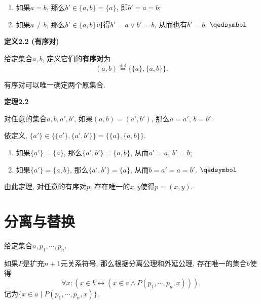 
\begin{enumerate}
    \item 如果$a=b$, 那么$b'\in\{a,b\}=\{a\}$, 即$b'=a=b$;
    \item 如果$a\neq b$, 那么$b'\in\{a,b\}$可得$b'=a\lor b'=b$, 从而也有$b'=b$.
    \hfill $\qedsymbol$
\end{enumerate}

\vspace{10pt}

\hypertarget{sec:定义2.2}{}
\noindent\textbf{定义2.2 (有序对)}

给定集合$a,b$, 定义它们的\textbf{有序对}为
\[
    (a,b)\overset{\mathrm{def}}{=}\{\{a\},\{a,b\}\}.
\]

\vspace{10pt}

有序对可以唯一确定两个原集合.

\vspace{10pt}

\hypertarget{sec:定理2.2}{}
\noindent\textbf{定理2.2}

对任意的集合$a,b,a',b'$, 如果$(a,b)=(a',b')$, 那么$a=a'$, $b=b'$.


依定义, $\{a'\}\in\{\{a'\},\{a',b'\}\}=\{\{a\},\{a,b\}\}$.

\begin{enumerate}
    \item 如果$\{a'\}=\{a\}$, 那么$\{a',b'\}=\{a,b\}$, 从而$a'=a$, $b'=b$;
    \item 如果$\{a'\}=\{a,b\}$, 那么$\{a',b'\}=\{a\}$, 从而$b=a'=a=b'$.
    \hfill $\qedsymbol$
\end{enumerate}

\vspace{10pt}

由此定理, 对任意的有序对$p$, 存在唯一的$x,y$使得$p=(x,y)$.





\newpage

\section{分离与替换}

给定集合$a,p_1,\cdots,p_n$.

如果$P$是扩充$n+1$元关系符号, 那么根据分离公理和外延公理, 存在唯一的集合$b$使得
\[
    \forall x:(x\in b\leftrightarrow(x\in a\land P(p_1,\cdots,p_n,x))),
\]
记为$\{x\in a\mid P(p_1,\cdots,p_n,x)\}$.


